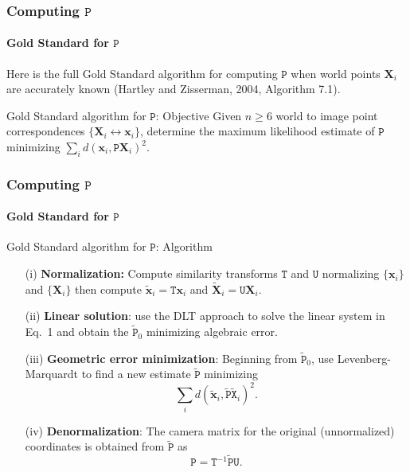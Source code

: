 \documentclass[aspectratio=169]{beamer}
\renewcommand{\vec}[1]{\boldsymbol{#1}}
\newcommand{\mat}[1]{\mathtt{#1}}
\begin{document}
\begin{frame}
\frametitle{Computing $\mat{P}$}
\framesubtitle{Gold Standard for $\mat{P}$}

Here is the full Gold Standard algorithm for computing $\mat{P}$ when
world points $\vec{X}_i$ are accurately known (Hartley and Zisserman,
2004, Algorithm 7.1).

\medskip

\begin{block}{Gold Standard algorithm for $\mat{P}$: Objective}
Given $n \ge 6$ world to image point correspondences $\{\vec{X}_i
\leftrightarrow \vec{x}_i \}$, determine the maximum likelihood
estimate of $\mat{P}$ minimizing $\sum_i
d(\vec{x}_i,\mat{P}\vec{X}_i)^2$.
\end{block}

\end{frame}

\begin{frame}
\frametitle{Computing $\mat{P}$}
\framesubtitle{Gold Standard for $\mat{P}$}

\begin{block}{Gold Standard algorithm for $\mat{P}$: Algorithm}
\begin{itemize}
\item[(i)] {\bf Normalization:} Compute similarity transforms
  $\mat{T}$ and $\mat{U}$ normalizing $\{\vec{x}_i\}$ and
  $\{\vec{X}_i\}$ then compute $\tilde{\vec{x}}_i=\mat{T}\vec{x}_i$
  and $\tilde{\vec{X}}_i=\mat{U}\vec{X}_i$.
\item[(ii)] {\bf Linear solution}: use the DLT approach to solve the
  linear system in Eq.\ 1 and obtain the $\tilde{\mat{P}}_0$ minimizing
  algebraic error.
\item[(iii)] {\bf Geometric error minimization}: Beginning from
  $\tilde{\mat{P}}_0$, use Levenberg-Marquardt to find a new estimate
  $\tilde{\mat{P}}$ minimizing \[ \sum_i
  d(\tilde{\vec{x}}_i,\tilde{\mat{P}}\tilde{\mat{X}}_i)^2.\]
\item[(iv)] {\bf Denormalization}: The camera matrix for the original
  (unnormalized) coordinates is obtained from $\tilde{\mat{P}}$ as
  \[ \mat{P}=\mat{T}^{-1}\tilde{\mat{P}}\mat{U}. \]
\end{itemize}
\end{block}

\end{frame}
\end{document}
